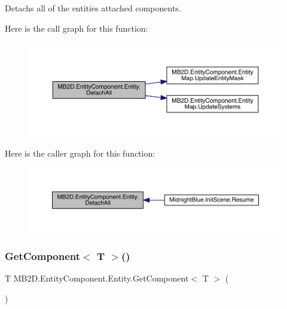 Detachs all of the entities attached components. 

Here is the call graph for this function\+:
\nopagebreak
\begin{figure}[H]
\begin{center}
\leavevmode
\includegraphics[width=350pt]{class_m_b2_d_1_1_entity_component_1_1_entity_a5c006a368383ba7b17653d9f958ceaf8_cgraph}
\end{center}
\end{figure}
Here is the caller graph for this function\+:
\nopagebreak
\begin{figure}[H]
\begin{center}
\leavevmode
\includegraphics[width=350pt]{class_m_b2_d_1_1_entity_component_1_1_entity_a5c006a368383ba7b17653d9f958ceaf8_icgraph}
\end{center}
\end{figure}
\hypertarget{class_m_b2_d_1_1_entity_component_1_1_entity_a637f3b4df5ecd5d4e6c7630740d1676f}{}\label{class_m_b2_d_1_1_entity_component_1_1_entity_a637f3b4df5ecd5d4e6c7630740d1676f} 
\subsubsection{\texorpdfstring{Get\+Component$<$ T $>$()}{GetComponent< T >()}}
{\footnotesize\ttfamily T M\+B2\+D.\+Entity\+Component.\+Entity.\+Get\+Component$<$ T $>$ (\begin{DoxyParamCaption}{ }\end{DoxyParamCaption})\hspace{0.3cm}{\ttfamily [inline]}}



